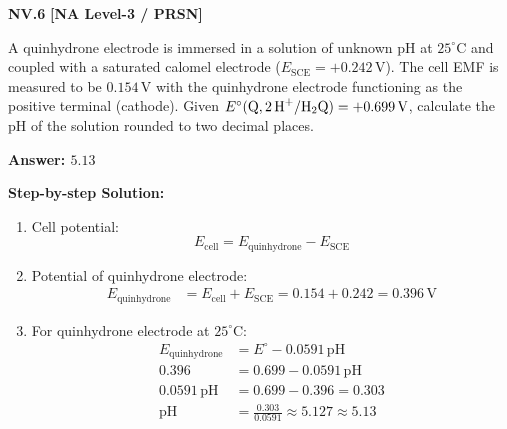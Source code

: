 \begin{problembox}
\textbf{NV.6} \hfill \textbf{[NA Level-3 / PRSN]}

A quinhydrone electrode is immersed in a solution of unknown pH at $25^\circ\text{C}$ and coupled with a saturated calomel electrode ($E_{\text{SCE}} = +0.242\,\text{V}$). The cell EMF is measured to be $0.154\,\text{V}$ with the quinhydrone electrode functioning as the positive terminal (cathode). Given $E^\circ(\ce{Q, 2H+/H2Q}) = +0.699\,\text{V}$, calculate the $\text{pH}$ of the solution rounded to two decimal places.
\end{problembox}
\begin{solution}
\textbf{Answer: $5.13$}

\textbf{Step-by-step Solution:}
\begin{enumerate}
    \item Cell potential:
    \begin{equation*}
        E_{\text{cell}} = E_{\text{quinhydrone}} - E_{\text{SCE}}
    \end{equation*}
    \item Potential of quinhydrone electrode:
    \begin{align*}
        E_{\text{quinhydrone}} &= E_{\text{cell}} + E_{\text{SCE}} = 0.154 + 0.242 = 0.396\,\text{V}
    \end{align*}
    \item For quinhydrone electrode at $25^\circ\text{C}$:
    \begin{align*}
        E_{\text{quinhydrone}} &= E^\circ - 0.0591\,\text{pH} \\
        0.396 &= 0.699 - 0.0591\,\text{pH} \\
        0.0591\,\text{pH} &= 0.699 - 0.396 = 0.303 \\
        \text{pH} &= \frac{0.303}{0.0591} \approx 5.127 \approx 5.13
    \end{align*}
\end{enumerate}
\end{solution}

